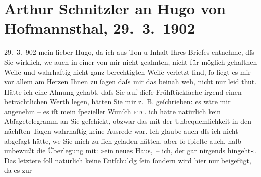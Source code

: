 

         
         \renewcommand{\erwaehntePersonen}{Personen: Hugo von Hofmannsthal, Malvine von Pollanetz}
         \renewcommand{\erwaehnteOrte}{Orte: Wien}
         \renewcommand{\erwaehnteWerke}{Werke: Über unsere Kraft}
               \section[Arthur Schnitzler an Hugo von Hofmannsthal, 29. 3. 1902]{ Arthur Schnitzler an Hugo von Hofmannsthal, 29. 3. 1902}\nopagebreak{}\rehead{ }\begin{ledgroupsized}[t]{13cm}\normalsize\beginnumbering{} \toendnotes[C]{\smallbreak\pagebreak[2]} 
\pstart
           \raggedleft{}{\pb}29. 3. 902\pend
           \pstart
           mein lieber Hugo, da ich aus Ton u Inhalt Ihres Briefes entnehme,
               dſs Sie wirklich, we{\geminationn} auch in einer von mir nicht
               geahnten, nicht für möglich gehaltnen Weiſe und wahrhaftig nicht ganz berechtigten
               Weiſe verletzt ſind, ſo liegt es mir vor {\pb}allem am Herzen
               Ihnen zu ſagen daſs mir das beinah weh, nicht \introOben{}nur\introOben{} leid thut.
               Hätte ich eine Ahnung gehabt, daſs Sie auf dieſe Frühſtückſache irgend einen
               beträchtlichen Werth legen, hätten Sie mir z. B. geſchrieben: es wäre mir angenehm –
                  {\pb}es iſt mein ſpezieller Wunſch \textsc{etc}. ich hätte natürlich kein Abſagetelegramm an Sie geſchickt, obzwar das
               mit der Unbequemlichkeit in den nächſten Tagen wahrhaftig keine Ausrede war. Ich
               glaube auch dſs ich nicht abgeſagt hätte, we{\geminationn} Sie mich
               zu {\pb}ſich geladen hätten, aber ſo ſpielte auch, halb
               unbewußt die Überlegung mit: »ein neues Haus, – ich, der gar nirgends hingeht«. Das
               letztere ſoll natürlich keine Entſchuldg ſein ſondern \strikeout{\textcolor{gray}{aus}} wird hier nur beigefügt, da es zur

\end{ledgroupsized}
